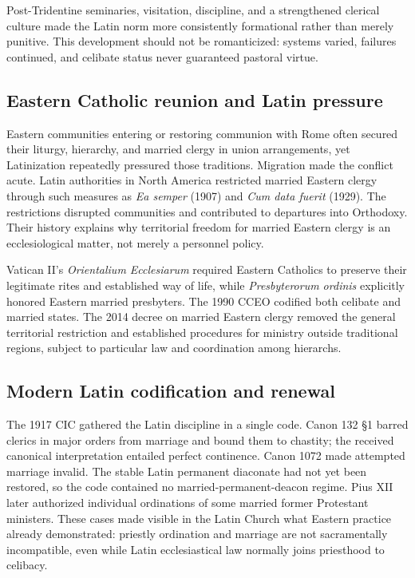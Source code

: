 Post-Tridentine seminaries, visitation, discipline, and a strengthened clerical culture made the Latin norm more consistently formational rather than merely punitive. This development should not be romanticized: systems varied, failures continued, and celibate status never guaranteed pastoral virtue.

\subsection{Eastern Catholic reunion and Latin pressure}

Eastern communities entering or restoring communion with Rome often secured their liturgy, hierarchy, and married clergy in union arrangements, yet Latinization repeatedly pressured those traditions. Migration made the conflict acute. Latin authorities in North America restricted married Eastern clergy through such measures as \emph{Ea semper} (1907) and \emph{Cum data fuerit} (1929). The restrictions disrupted communities and contributed to departures into Orthodoxy. Their history explains why territorial freedom for married Eastern clergy is an ecclesiological matter, not merely a personnel policy.

Vatican II's \emph{Orientalium Ecclesiarum} required Eastern Catholics to preserve their legitimate rites and established way of life, while \emph{Presbyterorum ordinis} explicitly honored Eastern married presbyters. The 1990 CCEO codified both celibate and married states. The 2014 decree on married Eastern clergy removed the general territorial restriction and established procedures for ministry outside traditional regions, subject to particular law and coordination among hierarchs.

\subsection{Modern Latin codification and renewal}

The 1917 CIC gathered the Latin discipline in a single code. Canon 132 \S1 barred clerics in major orders from marriage and bound them to chastity; the received canonical interpretation entailed perfect continence. Canon 1072 made attempted marriage invalid. The stable Latin permanent diaconate had not yet been restored, so the code contained no married-permanent-deacon regime. Pius XII later authorized individual ordinations of some married former Protestant ministers. These cases made visible in the Latin Church what Eastern practice already demonstrated: priestly ordination and marriage are not sacramentally incompatible, even while Latin ecclesiastical law normally joins priesthood to celibacy.

